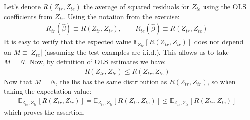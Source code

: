 

Let's denote $R(Z_{tr}, Z_{te})$ the average of squared residuals for $Z_{te}$ using the OLS coefficients from $Z_{tr}$. Using the notation from the exercise:
\begin{eqnarray*}
    R_{tr}(\hat{\beta}) \equiv R(Z_{tr}, Z_{tr}), \qquad R_{te}(\hat{\beta}) \equiv R(Z_{tr}, Z_{te})
\end{eqnarray*}
It is easy to verify that the expected value $ \mathbb{E}_{Z_{te}} \left[ R(Z_{tr}, Z_{te}) \right]$ does not depend on $M \equiv |Z_{te}|$ (assuming the test examples are i.i.d.). This allows us to take $M = N$. Now, by definition of OLS estimates we have:
\begin{eqnarray*}
    R(Z_{te}, Z_{te}) \leq R(Z_{tr}, Z_{te})
\end{eqnarray*}
Now that $M = N$, the lhs has the same distribution as $R(Z_{tr}, Z_{tr})$, so when taking the expectation value:
\begin{eqnarray*}
    \mathbb{E}_{Z_{te}, Z_{tr}} \left[ R(Z_{tr}, Z_{tr}) \right] = \mathbb{E}_{Z_{te}, Z_{tr}} \left[ R(Z_{te}, Z_{te}) \right] \leq \mathbb{E}_{Z_{te}, Z_{tr}} \left[ R(Z_{tr}, Z_{te})  \right]
\end{eqnarray*}
which proves the assertion.